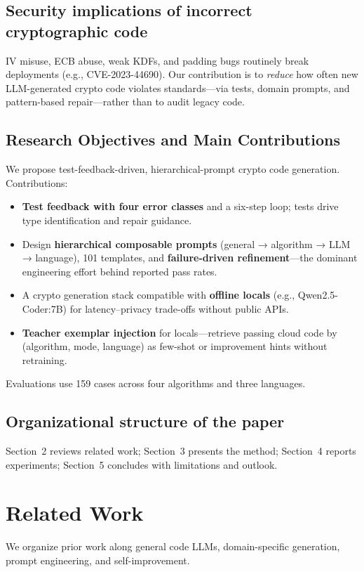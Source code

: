 \documentclass[12pt]{llncs}
\begin{document}
\subsection{Security implications of incorrect cryptographic code}
\label{subsec:security_implications}
IV misuse, ECB abuse, weak KDFs, and padding bugs routinely break deployments (e.g., CVE-2023-44690). Our contribution is to \emph{reduce} how often new LLM-generated crypto code violates standards---via tests, domain prompts, and pattern-based repair---rather than to audit legacy code.

\subsection{Research Objectives and Main Contributions}
We propose test-feedback-driven, hierarchical-prompt crypto code generation. Contributions:
\begin{itemize}
    \item \textbf{Test feedback with four error classes} and a six-step loop; tests drive type identification and repair guidance.
    \item Design \textbf{hierarchical composable prompts} (general → algorithm → LLM → language), 101 templates, and \textbf{failure-driven refinement}---the dominant engineering effort behind reported pass rates.
    \item A crypto generation stack compatible with \textbf{offline locals} (e.g., Qwen2.5-Coder:7B) for latency--privacy trade-offs without public APIs.
    \item \textbf{Teacher exemplar injection} for locals---retrieve passing cloud code by (algorithm, mode, language) as few-shot or improvement hints without retraining.
\end{itemize}
Evaluations use 159 cases across four algorithms and three languages.

\subsection{Organizational structure of the paper}
Section~2 reviews related work; Section~3 presents the method; Section~4 reports experiments; Section~5 concludes with limitations and outlook.

\section{Related Work}
We organize prior work along general code LLMs, domain-specific generation, prompt engineering, and self-improvement.
\end{document}
